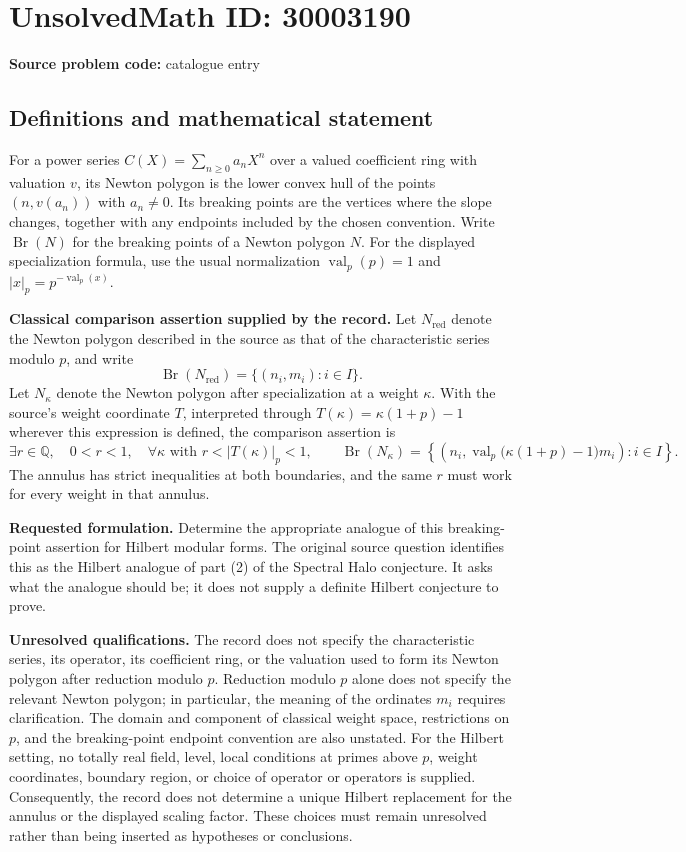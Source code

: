 \documentclass[11pt]{article}
\newcommand{\Q}{\mathbb{Q}}
\begin{document}
\section*{UnsolvedMath ID: 30003190}
\textbf{Source problem code:} catalogue entry
\subsection{Definitions and mathematical statement}
For a power series \(C(X)=\sum_{n\geq 0}a_nX^n\) over a valued coefficient ring with valuation \(v\), its Newton polygon is the lower convex hull of the points \((n,v(a_n))\) with \(a_n\neq 0\). Its breaking points are the vertices where the slope changes, together with any endpoints included by the chosen convention. Write \(\operatorname{Br}(N)\) for the breaking points of a Newton polygon \(N\). For the displayed specialization formula, use the usual normalization \(\operatorname{val}_p(p)=1\) and \(|x|_p=p^{-\operatorname{val}_p(x)}\).

\textbf{Classical comparison assertion supplied by the record.} Let \(N_{\mathrm{red}}\) denote the Newton polygon described in the source as that of the characteristic series modulo \(p\), and write
\[
\operatorname{Br}(N_{\mathrm{red}})=\{(n_i,m_i):i\in I\}.
\]
Let \(N_\kappa\) denote the Newton polygon after specialization at a weight \(\kappa\). With the source's weight coordinate \(T\), interpreted through \(T(\kappa)=\kappa(1+p)-1\) wherever this expression is defined, the comparison assertion is
\[
\exists r\in\Q,\quad 0<r<1,\quad
\forall\kappa\text{ with }r<|T(\kappa)|_p<1,\qquad
\operatorname{Br}(N_\kappa)
=
\left\{\left(n_i,\operatorname{val}_p\bigl(\kappa(1+p)-1\bigr)m_i\right):i\in I\right\}.
\]
The annulus has strict inequalities at both boundaries, and the same \(r\) must work for every weight in that annulus.

\textbf{Requested formulation.} Determine the appropriate analogue of this breaking-point assertion for Hilbert modular forms. The original source question identifies this as the Hilbert analogue of part (2) of the Spectral Halo conjecture. It asks what the analogue should be; it does not supply a definite Hilbert conjecture to prove.

\textbf{Unresolved qualifications.} The record does not specify the characteristic series, its operator, its coefficient ring, or the valuation used to form its Newton polygon after reduction modulo \(p\). Reduction modulo \(p\) alone does not specify the relevant Newton polygon; in particular, the meaning of the ordinates \(m_i\) requires clarification. The domain and component of classical weight space, restrictions on \(p\), and the breaking-point endpoint convention are also unstated. For the Hilbert setting, no totally real field, level, local conditions at primes above \(p\), weight coordinates, boundary region, or choice of operator or operators is supplied. Consequently, the record does not determine a unique Hilbert replacement for the annulus or the displayed scaling factor. These choices must remain unresolved rather than being inserted as hypotheses or conclusions.
\end{document}
